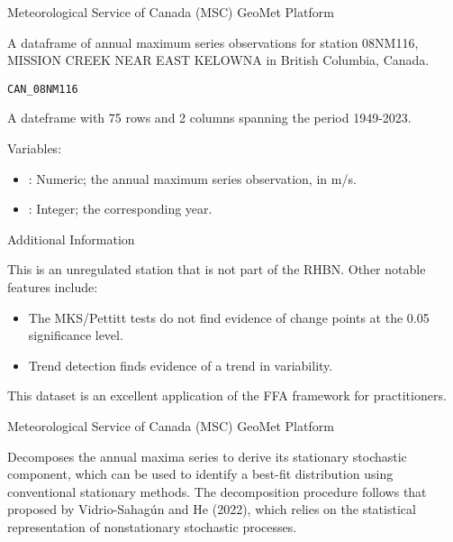 \documentclass[a4paper]{book}
\begin{document}
%
\begin{Source}
Meteorological Service of Canada (MSC) GeoMet Platform
\end{Source}
%
\begin{Description}
A dataframe of annual maximum series observations for
station 08NM116, MISSION CREEK NEAR EAST KELOWNA in British Columbia, Canada.
\end{Description}
%
\begin{Usage}
\begin{verbatim}
CAN_08NM116
\end{verbatim}
\end{Usage}
%
\begin{Format}
A dateframe with 75 rows and 2 columns spanning the period 1949-2023.
\end{Format}
%
\begin{Details}
Variables:
\begin{itemize}

\item{} : Numeric; the annual maximum series observation, in m/s.
\item{} : Integer; the corresponding year.

\end{itemize}

\end{Details}
%
\begin{Section}{Additional Information}

This is an unregulated station that is not part of the RHBN. Other notable features include:
\begin{itemize}

\item{} The MKS/Pettitt tests do not find evidence of change points at the 0.05 significance level.
\item{} Trend detection finds evidence of a trend in variability.

\end{itemize}


This dataset is an excellent application of the FFA framework for practitioners.
\end{Section}
%
\begin{Source}
Meteorological Service of Canada (MSC) GeoMet Platform
\end{Source}
%
\begin{Description}
Decomposes the annual maxima series to derive its stationary stochastic component,
which can be used to identify a best-fit distribution using conventional stationary
methods. The decomposition procedure follows that proposed by Vidrio-Sahagún and He
(2022), which relies on the statistical representation of nonstationary stochastic
processes.
\end{Description}
\end{document}
